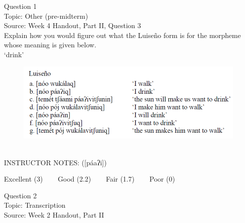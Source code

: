 \documentclass[12pt]{article}
\begin{document}
\begin{center}
\textbf{{\color{violet}{\HUGE 20201006 Tuesday\\}}}

\textbf{{\color{violet}{\HUGE ALL EXAMS (with notes)\\}}}

\end{center}
\newpage

\begin{center}
\textbf{{\color{blue}{\HUGE START OF EXAM\\}}}

\textbf{{\color{blue}{\HUGE Student ID: 15082\\}}}

\textbf{{\color{blue}{\HUGE 9:00\\}}}

\end{center}
\newpage

{\large Question 1}\\

Topic: Other (pre-midterm)\\
Source: Week 4 Handout, Part II, Question 3\\

Explain how you would figure out what the Luiseño form is for the morpheme whose meaning is given below.\\

‘drink’

\begin{figure}[H]
\includegraphics{../images/luiseno.png}
\end{figure}

~\\
INSTRUCTOR NOTES: ([páaʔi])


\vfill
Excellent (3) ~~~ Good (2.2) ~~~ Fair (1.7) ~~~ Poor (0)
\newpage

{\large Question 2}\\

Topic: Transcription\\
Source: Week 2 Handout, Part II\\
\end{document}
